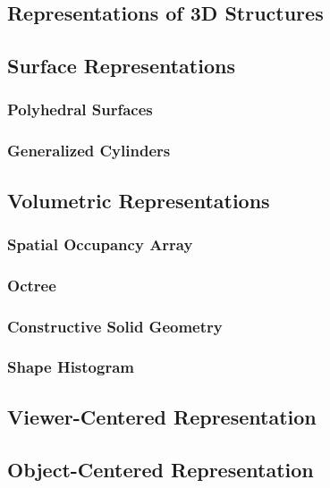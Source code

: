 \documentclass{article}
\begin{document}
\begin{multicols}{2}
\section{Representations of 3D Structures}
\subsection{Surface Representations}
\subsubsection{Polyhedral Surfaces}
\subsubsection{Generalized Cylinders}
\subsection{Volumetric Representations}
\subsubsection{Spatial Occupancy Array}
\subsubsection{Octree}
\subsubsection{Constructive Solid Geometry}
\subsubsection{Shape Histogram}
\subsection{Viewer-Centered Representation}
\subsection{Object-Centered Representation}

\end{multicols}
\end{document}
